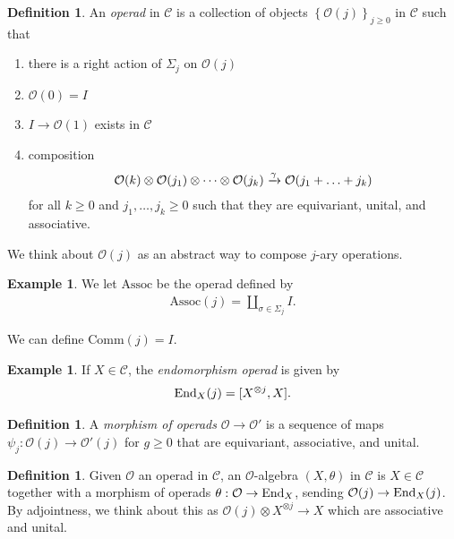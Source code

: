 \documentclass[12pt]{amsart}
\theoremstyle{definition}
\newtheorem{definition}[theorem]{Definition}
\newtheorem{example}[theorem]{Example}
\renewcommand{\O}{\mathcal{O}}
\providecommand{\Assoc}{\text{Assoc}}
\providecommand{\Comm}{\text{Comm}}
\begin{document}
\begin{definition} An \textit{operad} in $\mathscr{C}$ is a collection of objects $\left\{ \O(j) \right\}_{j\ge 0}$ in $\mathscr{C}$ such that
\begin{enumerate}
    \item there is a right action of $\Sigma_j$ on $\O(j)$
    \item $\O(0) = I$
    \item $I \to \O(1)$ exists in $\mathscr{C}$
    \item composition
    \begin{align*}
        \O(k) \otimes\O(j_1) \otimes \cdots \otimes \O(j_k) \xto{\gamma} \O(j_1 + \ldots + j_k)
    \end{align*}
    for all $k \ge 0$ and $j_1, \ldots, j_k \ge 0$ such that they are equivariant, unital, and associative.
\end{enumerate}
\end{definition}

We think about $\O(j)$ as an abstract way to compose $j$-ary operations.

\begin{example}\label{ex:labelname} We let $\Assoc$ be the operad defined by
\begin{align*}
    \Assoc(j) = \amalg_{\sigma\in \Sigma_j} I.
\end{align*}
\end{example}

We can define $\Comm(j) = I$.

\begin{example} If $X \in \mathscr{C}$, the \textit{endomorphism operad} is given by
\begin{align*}
    \text{End}_X(j) = [X^{\otimes j}, X].
\end{align*}
\end{example}

\begin{definition} A \textit{morphism of operads} $\O \to \O'$ is a sequence of maps $\psi_j : \O(j) \to \O'(j)$ for $g\ge 0$ that are equivariant, associative, and unital.
\end{definition}

\begin{definition} Given $\O$ an operad in $\mathscr{C}$, an $\O$-algebra $(X,\theta)$ in $\mathscr{C}$ is $X\in \mathscr{C}$ together with a morphism of operads $\theta: \O \to \End_X$, sending $\O(j) \to \End_X(j)$. By adjointness, we think about this as $\O(j) \otimes X^{\otimes j} \to X$ which are associative and unital.
\end{definition}
\end{document}
